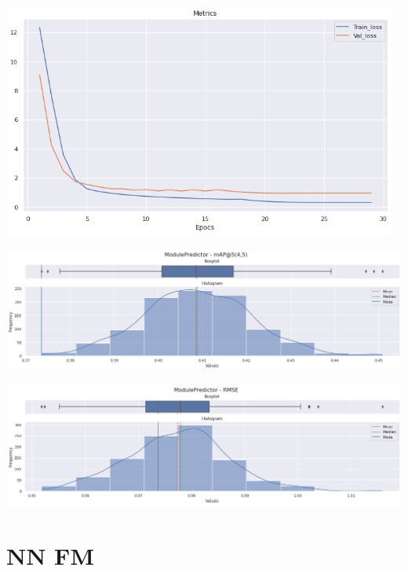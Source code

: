 \documentclass[11pt,a4paper,twoside]{thesis}
\begin{document}
\begin{center}
	\includegraphics[width=13cm]{./images/metrics-BGFM-train-val-loss.png}
\end{center}

\begin{center}
	\includegraphics[width=16cm]{./images/metrics-BGFM-mapk.png}
\end{center}


\begin{center}
	\includegraphics[width=16cm]{./images/metrics-BGFM-RMSE.png}
\end{center}


\section{NN FM}
\end{document}

